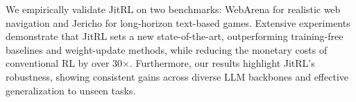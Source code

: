 



We empirically validate JitRL on two benchmarks: WebArena \citep{webarena} for realistic web navigation and Jericho \citep{jericho} for long-horizon text-based games. Extensive experiments demonstrate that JitRL sets a new state-of-the-art,  outperforming training-free baselines and weight-update methods, while reducing the monetary costs of conventional RL by over 30×. Furthermore, our results highlight JitRL's robustness, showing consistent gains across diverse LLM backbones and effective generalization to unseen tasks. 

